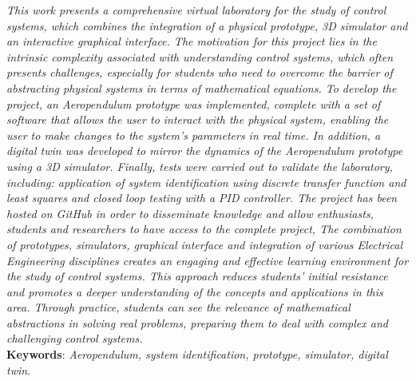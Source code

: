 \begin{resumo}

\textit{This work presents a comprehensive virtual laboratory for the study of control systems, which combines the integration of a physical prototype, 3D simulator and an interactive graphical interface. The motivation for this project lies in the intrinsic complexity associated with understanding control systems, which often presents challenges, especially for students who need to overcome the barrier of abstracting physical systems in terms of mathematical equations. To develop the project, an Aeropendulum prototype was implemented, complete with a set of software that allows the user to interact with the physical system, enabling the user to make changes to the system's parameters in real time. In addition, a digital twin was developed to mirror the dynamics of the Aeropendulum prototype using a 3D simulator. Finally, tests were carried out to validate the laboratory, including: application of system identification using discrete transfer function and least squares and closed loop testing with a PID controller. The project has been hosted on GitHub in order to disseminate knowledge and allow enthusiasts, students and researchers to have access to the complete project, The combination of prototypes, simulators, graphical interface and integration of various Electrical Engineering disciplines creates an engaging and effective learning environment for the study of control systems. This approach reduces students' initial resistance and promotes a deeper understanding of the concepts and applications in this area. Through practice, students can see the relevance of mathematical abstractions in solving real problems, preparing them to deal with complex and challenging control systems.}\\

\textbf{Keywords}: \textit{Aeropendulum, system identification, prototype, simulator, digital twin}.
\end{resumo}
